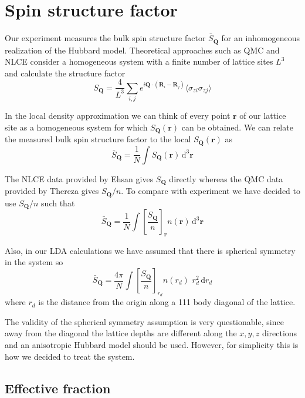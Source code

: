 \documentclass[11pt,letter]{article}
\newcommand{\bv}[1]{\ensuremath{\bm{#1}}}
\begin{document}
\section{ Spin structure factor }

Our experiment measures the bulk spin structure factor $\bar{S}_{\bv{Q}}$ for
an inhomogeneous realization of the Hubbard model.  Theoretical approaches such
as QMC and NLCE consider a homogeneous system with a finite number of lattice
sites $L^{3}$ and  calculate the structure factor 
\begin{equation} 
    S_{\bv{Q}} = \frac{4}{L^{3}} \sum_{i,j} 
     e^{i\bv{Q}\cdot ( \bv{R}_{i} - \bv{R}_{j} )} \langle \sigma_{zi} \sigma_{zj}  \rangle
\end{equation}

In the local density approximation we can think of every point $\bv{r}$ of our
lattice site as a homogeneous system for which $S_{\bv{Q}}(\bv{r})$ can be
obtained.  We can relate the measured bulk spin structure factor
 to the local $S_{\bv{Q}}(\bv{r})$ as
\begin{equation}
  \bar{S}_{\bv{Q}}  = \frac{1}{N} \int  S_{\bv{Q}}(\bv{r}) \, \mathrm{d}^{3} \bv{r}
\end{equation}

The NLCE data provided by Ehsan gives $S_{\bv{Q}}$ directly whereas the QMC
data provided by Thereza gives $S_{\bv{Q}}/n$.  To compare with experiment we
have decided to use $S_{\bv{Q}}/n$ such that  
\begin{equation}
  \bar{S}_{\bv{Q}}  = \frac{1}{N} 
   \int \left[ \frac{  S_{\bv{Q}} }{n} \right]_{\bv{r}}
    n(\bv{r})  \, \mathrm{d}^{3} \bv{r}
\end{equation}

Also, in our LDA calculations we have assumed that there is spherical symmetry
in the system so 
\begin{equation}
  \bar{S}_{\bv{Q}}  = \frac{4\pi}{N} 
   \int \left[ \frac{  S_{\bv{Q}} }{n} \right]_{r_{d}}
    n(r_{d}) \,\, r_{d}^{2}   \, \mathrm{d}r_{d}
\end{equation}
where $r_{d}$ is the distance from the origin along a 111 body diagonal of the
lattice.  

The validity of the spherical symmetry assumption is very questionable, since
away from the diagonal the lattice depths are different along the $x,y,z$
directions and an anisotropic Hubbard model should be used. However, for
simplicity this is how we decided to treat the system.

\subsection{ Effective fraction} 
\end{document}
